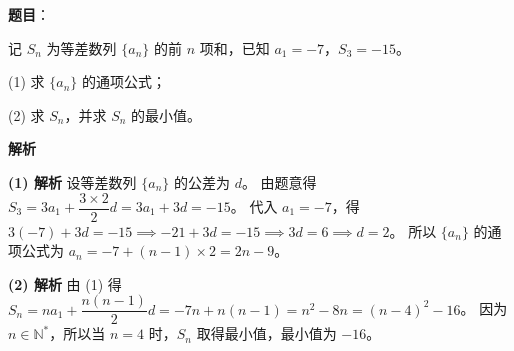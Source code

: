 \begin{answer}

\textbf{题目}：

记 $S_n$ 为等差数列 $\{a_n\}$ 的前 $n$ 项和，已知 $a_1=-7$，$S_3=-15$。

(1) 求 $\{a_n\}$ 的通项公式；

(2) 求 $S_n$，并求 $S_n$ 的最小值。

\textbf{解析}

\textbf{(1) 解析} 设等差数列 $\{a_n\}$ 的公差为 $d$。
由题意得 $S_3 = 3a_1 + \dfrac{3\times 2}{2}d = 3a_1+3d = -15$。
代入 $a_1=-7$，得 $3(-7)+3d = -15 \implies -21+3d = -15 \implies 3d = 6 \implies d=2$。
所以 $\{a_n\}$ 的通项公式为 $a_n = -7 + (n-1)\times 2 = 2n-9$。

\textbf{(2) 解析} 由 (1) 得 $S_n = na_1 + \dfrac{n(n-1)}{2}d = -7n + n(n-1) = n^2-8n = (n-4)^2-16$。
因为 $n\in\mathbb N^*$，所以当 $n=4$ 时，$S_n$ 取得最小值，最小值为 $-16$。



\end{answer}
